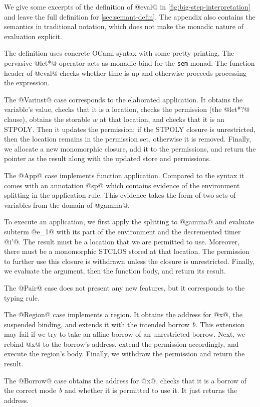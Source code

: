 

We give some excerpts of the definition of @eval@ in
\cref{fig:big-step-interpretation} and leave the full
definition for \cref{sec:semant-defin}. The appendix also
contains the semantics
in traditional notation, which does not make the monadic nature of
evaluation explicit.

The definition uses concrete OCaml syntax with some pretty
printing. The pervasive @let*@ operator acts as monadic bind
for the \lstinline/sem/ monad. The function header of @eval@ checks
whether time is up and otherwise proceeds processing the expression.

The @Varinst@ case corresponds to the elaborated application. It
obtains the variable's value, checks that it is a location, checks the
permission (the @let*?@ clause), obtains the storable $w$ at that
location, and checks that it is an STPOLY. Then it updates the
permission: if the STPOLY closure is unrestricted, then the location
remains in the permission set, otherwise it is removed. Finally, we
allocate a new monomorphic closure, add it to the permissions, and
return the pointer as the result along with the updated store and
permissions.

The @App@ case implements function application. Compared to the syntax
it comes with an annotation @sp@ which contains evidence of the
environment splitting in the application rule. This evidence takes the
form of two sets of variables from the domain of @gamma@.

To execute an application, we first apply the splitting to @gamma@ and
evaluate subterm @e_1@ with its part of the environment and the
decremented timer @i'@. The result must be a location that we are
permitted to use. Moreover, there must be a monomorphic STCLOS stored
at that location. The permission to further use this closure is
withdrawn unless the closure is unrestricted. Finally, we evaluate the
argument, then the function body, and return its result.

The @Pair@ case does not present any new features, but it
corresponds to the  typing rule.

The @Region@ case implements a region. It obtains the address for @x@,
the suspended binding, and extends it with the intended borrow
$\textit{b}$. This extension may fail if we try to take an affine borrow
of an unrestricted borrow. Next, we rebind @x@ to the borrow's
address, extend the permission accordingly, and execute the region's
body.  Finally, we withdraw the permission and return the result.

The @Borrow@ case obtains the address for @x@, checks that it is a
borrow of the correct mode $\textit{b}$ and whether it is permitted to
use it. It just returns the address.

\lstDeleteShortInline@

